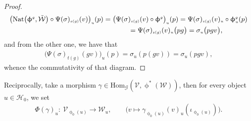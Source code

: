 \documentclass[pdftex]{sigma}
\numberwithin{equation}{section}
\renewcommand{\hom}[3]{\mathrm{Hom}_{\Sscript{#1}}\left(#2, #3\right)}
\newcommand{\Ho}{\cH_{\Sscript{0}}}
\newcommand{\Wu}{\cW_{\Sscript{u}}}
\newcommand{\cG}{{\mathcal G}}
\newcommand{\cH}{{\mathcal H}}
\newcommand{\cV}{{\mathcal V}}
\newcommand{\cW}{{\mathcal W}}
\newcommand{\Sscript}[1]{\scriptscriptstyle{#1}}
\begin{document}
\begin{proof}
\begin{gather*}
\big( {\rm Nat}\big(\upphi^{\Sscript{g}}, \tilde{\cW}\big) \circ \Psi(\sigma)_{\Sscript{s(g)}}(v) \big)_{\Sscript{u}}(p) = \big(\Psi(\sigma)_{\Sscript{s(g)}}(v) \circ \upphi^{\Sscript{g}}\big)_{\Sscript{u}}(p) =\Psi(\sigma)_{\Sscript{s(g)}}(v)_{\Sscript{u}} \circ
\upphi^{\Sscript{g}}_{\Sscript{u}}(p) \\
\hphantom{\big( {\rm Nat}\big(\upphi^{\Sscript{g}}, \tilde{\cW}\big) \circ \Psi(\sigma)_{\Sscript{s(g)}}(v) \big)_{\Sscript{u}}(p)}{} = \Psi(\sigma)_{\Sscript{s(g)}}(v)_{\Sscript{u}} \big(pg\big) =
\sigma_{\Sscript{u}} \big(pg v\big),
\end{gather*}
and from the other one, we have that
\begin{gather*}
\big( \Psi(\sigma)_{\Sscript{t(g)}}(gv)\big)_{\Sscript{u}}(p) = \sigma_{\Sscript{u}}(p(gv)) = \sigma_{\Sscript{u}}(pgv),
\end{gather*}
whence the commutativity of that diagram.
\end{proof}

Reciprocally, take a morphism $\gamma \in \hom{\cG}{\cV}{\upphi^*(\cW)}$, then for every object $u \in\Ho$,
we set
\begin{gather*}
\Phi(\gamma)_{\Sscript{u}}\colon \ \cV_{\Sscript{\upphi_{0}(u)}} \longrightarrow \Wu, \qquad \big( v \longmapsto \gamma_{\Sscript{\upphi_{0}(u)}}(v)_{\Sscript{u}}(\iota_{\Sscript{\upphi_{0}(u)}})\big).
\end{gather*}
\end{document}
